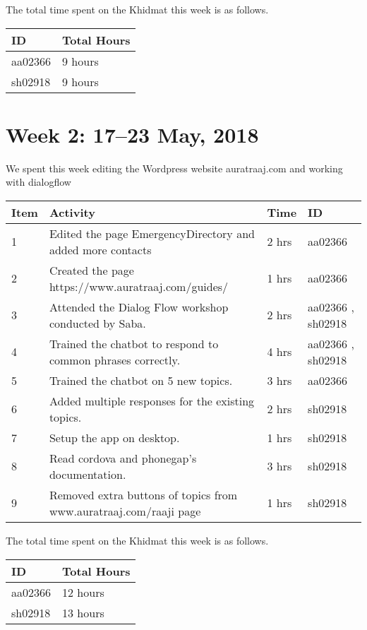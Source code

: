 ﻿\documentclass{article}
\begin{document}
The total time spent on the Khidmat this week is as follows.

\begin{tabular}{|l|l|}
  \hline
  ID & Total Hours\\\hline\hline
  aa02366 & 9 hours\\\hline
  sh02918 & 9 hours\\\hline
\end{tabular}

\newpage %
\section*{Week 2: 17--23 May, 2018}

We spent this week editing the Wordpress website auratraaj.com and working with dialogflow

\begin{tabular}{|l|l|l|l|}
  \hline
  Item 	& Activity & Time & ID \\\hline\hline
  1	& Edited the page EmergencyDirectory and added more contacts & 2 hrs & aa02366 \\\hline
  2	& Created the page https://www.auratraaj.com/guides/ & 1 hrs & aa02366 \\\hline
  3	& Attended the Dialog Flow workshop conducted by Saba. & 2 hrs & aa02366 , sh02918 \\\hline
  4	& Trained the chatbot to respond to common phrases correctly. & 4 hrs & aa02366 , sh02918 
  \\\hline
  5	& Trained the chatbot on 5 new topics. & 3 hrs & aa02366 \\\hline
  6	& Added multiple responses for the existing topics. & 2 hrs & sh02918 
  \\\hline
  7	& Setup the app on desktop. & 1 hrs & sh02918 
  \\\hline  
  8	& Read cordova and phonegap’s documentation. & 3 hrs & sh02918 
  \\\hline 
  9	& Removed extra buttons of topics from www.auratraaj.com/raaji page & 1 hrs & sh02918 
  \\\hline  
\end{tabular}

The total time spent on the Khidmat this week is as follows.

\begin{tabular}{|l|l|}
  \hline
  ID & Total Hours\\\hline\hline
  aa02366 & 12 hours\\\hline
  sh02918 & 13 hours\\\hline
\end{tabular}
\end{document}
